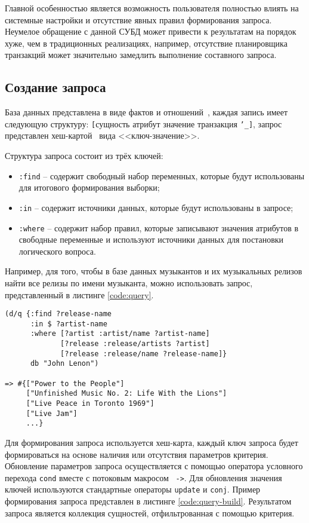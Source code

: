 Главной особенностью является возможность пользователя полностью влиять на системные настройки и отсутствие явных правил формирования запроса. Неумелое обращение с данной СУБД может привести к результатам на порядок хуже, чем в традиционных реализациях, например, отсутствие планировщика транзакций может значительно замедлить выполнение составного запроса.

\subsection{Создание запроса}

База данных представлена в виде фактов и отношений~\cite{datomic-facts}, каждая запись имеет следующую структуру: \texttt{[}сущность атрибут значение транзакция \texttt{'\_]}, запрос представлен хеш-картой~\cite{hash-map} вида <<ключ-значение>>.

Структура запроса состоит из трёх ключей:
\begin{itemize}
	\item \texttt{:find} -- содержит свободный набор переменных, которые будут использованы для итогового формирования выборки;
	\item \texttt{:in} -- содержит источники данных, которые будут использованы в запросе;
	\item \texttt{:where} -- содержит набор правил, которые записывают значения атрибутов в свободные переменные и используют источники данных для постановки логического вопроса.
\end{itemize}

Например, для того, чтобы в базе данных музыкантов и их музыкальных релизов найти все релизы по имени музыканта, можно использовать запрос, представленный в листинге \ref{code:query}. \\

\begin{lstlisting}[label=code:query, caption={Пример запроса}]
(d/q {:find ?release-name
      :in $ ?artist-name
      :where [?artist :artist/name ?artist-name]
             [?release :release/artists ?artist]
             [?release :release/name ?release-name]}
      db "John Lenon")
      
=> #{["Power to the People"] 
     ["Unfinished Music No. 2: Life With the Lions"] 
     ["Live Peace in Toronto 1969"] 
     ["Live Jam"]
     ...}
\end{lstlisting}

Для формирования запроса используется хеш-карта, каждый ключ запроса будет формироваться на основе наличия или отсутствия параметров критерия. Обновление параметров запроса осуществляется с помощью оператора условного перехода \texttt{cond} вместе с потоковым макросом~\cite{threading-macro} \texttt{->}. Для обновления значения ключей используются стандартные операторы \texttt{update} и \texttt{conj}. Пример формирования запроса представлен в листинге \ref{code:query-build}. Результатом запроса является коллекция сущностей, отфильтрованная с помощью критерия.

